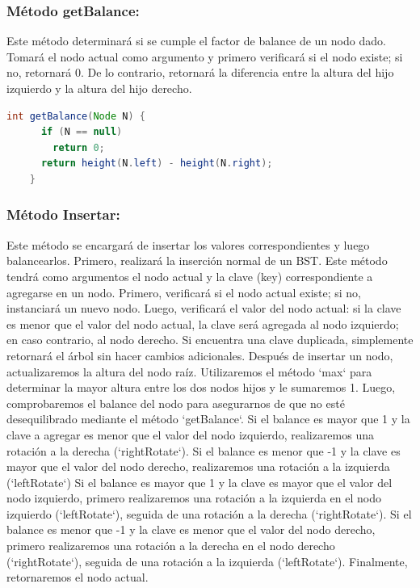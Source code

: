\documentclass{article}
\begin{document}
  \subsubsection{Método getBalance: }Este método determinará si se cumple el factor de balance de un nodo dado. 
  Tomará el nodo actual como argumento y primero verificará si el nodo existe; si no, retornará 0. De lo contrario, 
  retornará la diferencia entre la altura del hijo izquierdo y la altura del hijo derecho.
  \begin{lstlisting}[language=Java, caption={Ejemplo de código Java}]
    int getBalance(Node N) {
      if (N == null)
        return 0;
      return height(N.left) - height(N.right);
    }
  \end{lstlisting}


  \subsubsection{Método Insertar: }Este método se encargará de insertar los valores correspondientes y luego balancearlos. 
  Primero, realizará la inserción normal de un BST. Este método tendrá como argumentos el nodo actual y la clave (key) 
  correspondiente a agregarse en un nodo. Primero, verificará si el nodo actual existe; si no, instanciará un nuevo nodo. 
  Luego, verificará el valor del nodo actual: si la clave es menor que el valor del nodo actual, la clave será agregada 
  al nodo izquierdo; en caso contrario, al nodo derecho. Si encuentra una clave duplicada, simplemente retornará el árbol 
  sin hacer cambios adicionales.
  \newline
  Después de insertar un nodo, actualizaremos la altura del nodo raíz. Utilizaremos el método `max` para determinar la 
  mayor altura entre los dos nodos hijos y le sumaremos 1. Luego, comprobaremos el balance del nodo para asegurarnos de 
  que no esté desequilibrado mediante el método `getBalance`.
  \newline
  Si el balance es mayor que 1 y la clave a agregar es menor que el valor del nodo izquierdo, realizaremos una rotación 
  a la derecha (`rightRotate`). Si el balance es menor que -1 y la clave es mayor que el valor del nodo derecho, realizaremos 
  una rotación a la izquierda (`leftRotate`)
  \newline
  Si el balance es mayor que 1 y la clave es mayor que el valor del nodo izquierdo, primero realizaremos una rotación a la 
  izquierda en el nodo izquierdo (`leftRotate`), seguida de una rotación a la derecha (`rightRotate`). Si el balance es menor 
  que -1 y la clave es menor que el valor del nodo derecho, primero realizaremos una rotación a la derecha en el nodo derecho 
  (`rightRotate`), seguida de una rotación a la izquierda (`leftRotate`).
  \newline
  Finalmente, retornaremos el nodo actual.
\end{document}
